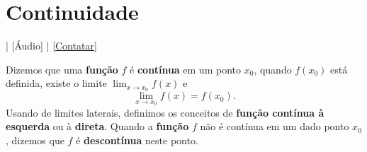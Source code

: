 \section{Continuidade}\label{cap_lim_sec_cont}

\begin{flushright}
  [Vídeo] | [Áudio] | \href{https://phkonzen.github.io/notas/contato.html}{[Contatar]}
\end{flushright}

Dizemos que uma {\bf função} $f$ é {\bf contínua} em um ponto $x_0$, quando $f(x_0)$ está definida, existe o limite $\displaystyle \lim_{x\to x_0} f(x)$ e
\begin{equation}
  \lim_{x\to x_0} f(x) = f(x_0).
\end{equation}
Usando de limites laterais, definimos os conceitos de {\bf função contínua à esquerda} ou à {\bf direta}. Quando a {\bf função} $f$ não é contínua em um dado ponto $x_0$, dizemos que $f$ é {\bf descontínua} neste ponto.

